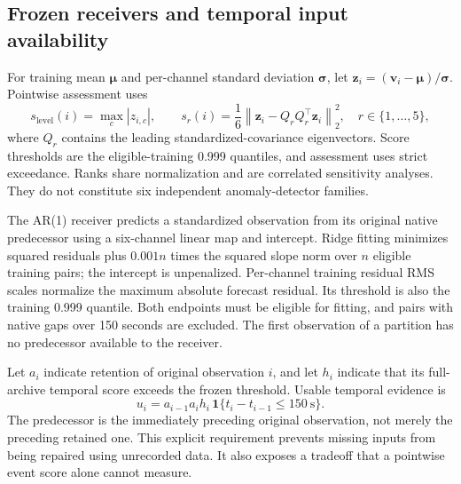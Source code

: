 \subsection{Frozen receivers and temporal input availability}
\label{sec:receivers}
For training mean $\boldsymbol\mu$ and per-channel standard deviation
$\boldsymbol\sigma$, let
$\mathbf z_i=(\mathbf v_i-\boldsymbol\mu)/\boldsymbol\sigma$.
Pointwise assessment uses
\begin{equation}
 s_{\mathrm{level}}(i)=\max_c|z_{i,c}|,\qquad
 s_r(i)=\frac{1}{6}\left\|\mathbf z_i-Q_rQ_r^\top\mathbf z_i\right\|_2^2,
 \quad r\in\{1,\ldots,5\},
\end{equation}
where $Q_r$ contains the leading standardized-covariance eigenvectors. Score
thresholds are the eligible-training 0.999 quantiles, and assessment uses strict
exceedance. Ranks share normalization and are correlated sensitivity analyses.
They do not constitute six independent anomaly-detector families.

The AR(1) receiver predicts a standardized observation from its original native
predecessor using a six-channel linear map and intercept. Ridge fitting minimizes
squared residuals plus $0.001n$ times the squared slope norm over $n$ eligible
training pairs; the intercept is unpenalized. Per-channel training residual RMS
scales normalize the maximum absolute forecast residual. Its threshold is also
the training 0.999 quantile. Both endpoints must be eligible for fitting, and
pairs with native gaps over 150 seconds are excluded. The first observation of a
partition has no predecessor available to the receiver.

Let $a_i$ indicate retention of original observation $i$, and let $h_i$ indicate
that its full-archive temporal score exceeds the frozen threshold. Usable temporal
evidence is
\begin{equation}
 u_i=a_{i-1}a_i h_i\,\mathbf 1\{t_i-t_{i-1}\leq150\ \mathrm{s}\}.
 \label{eq:temporal-evidence}
\end{equation}
The predecessor is the immediately preceding original observation, not merely
the preceding retained one. This explicit requirement prevents missing inputs
from being repaired using unrecorded data. It also exposes a tradeoff that a
pointwise event score alone cannot measure.

